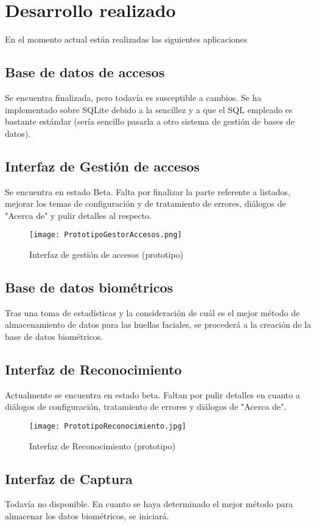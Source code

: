 \chapter{Desarrollo realizado}

En el momento actual están realizadas las siguientes aplicaciones

\section{Base de datos de accesos}
Se encuentra finalizada, pero todavía es susceptible a cambios. Se ha implementado sobre SQLite debido a la sencillez y a que el SQL empleado es bastante estándar (sería sencillo pasarla a otro sistema de gestión de bases de datos).

\section{Interfaz de Gestión de accesos}
Se encuentra en estado Beta. Falta por finalizar la parte referente a listados, mejorar los temas de configuración y de tratamiento de errores, diálogos de "Acerca de" y pulir detalles al respecto.

\begin{figure}[h!]
        \centering
        \texttt{[image: PrototipoGestorAccesos.png]}
        \caption{Interfaz de gestión de accesos (prototipo)}
	\label{fig:gestion_accesos}
\end{figure}


\section{Base de datos biométricos}
Tras una toma de estadísticas y la consideración de cuál es el mejor método de almacenamiento de datos para las huellas faciales, se procederá a la creación de la base de datos biométricos.

\section{Interfaz de Reconocimiento}
Actualmente se encuentra en estado beta. Faltan por pulir detalles en cuanto a diálogos de configuración, tratamiento de errores y diálogos de "Acerca de".

\begin{figure}[h!]
        \centering
        \texttt{[image: PrototipoReconocimiento.jpg]}
        \caption{Interfaz de Reconocimiento (prototipo)}
	\label{fig:reconocimiento}
\end{figure}

\section{Interfaz de Captura}
Todavía no disponible. En cuanto se haya determinado el mejor método para almacenar los datos biométricos, se iniciará.
